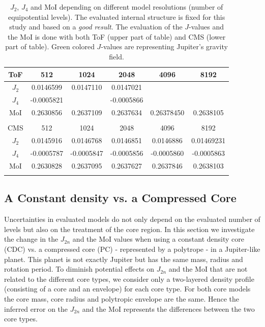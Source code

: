 \documentclass[usenatbib]{mnras}
\begin{document}
\begin{table}
\centering
\caption{$J_2$, $J_4$ and MoI depending on different model resolutions (number of equipotential levels). The evaluated internal structure is fixed for this study and based on a \textit{good result}. The evaluation of the $J$-values and the MoI is done with both ToF (upper part of table) and CMS (lower part of table). Green colored $J$-values are representing Jupiter's gravity field.}
 \begin{tabular}{c|c c c c c}
ToF & 512 & 1024 & 2048 & 4096 & 8192 \\
 \hline
$J_2$ & 0.0146599	&0.0147110	&0.0147021	&\color{green}{0.0146971} &\color{green}{0.0146965} \\
$J_4$ &-0.0005821	&\color{green}{-0.0005864}	&\color{green}-0.0005866	&\color{green}{-0.0005866}	&\color{green}{-0.000586682}\\
MoI	&0.2630856	&0.2637109	&0.2637634	&0.26378450	&0.2638105 \\
\\
CMS & 512 & 1024 & 2048 & 4096 & 8192 \\
 \hline
$J_2$ & 0.0145916	& 0.0146768	& 0.0146851	& 0.0146886 &  0.01469231\\
$J_4$ & -0.0005787	& -0.0005847 & -0.0005856 & -0.0005860 & -0.0005863\\
MoI & 0.2630828	& 0.2637095	& 0.2637627	& 0.2637846 &  0.2638103\\
\\
 \end{tabular}
\label{tab:resolution}
\end{table}

\subsection{A Constant density vs. a Compressed Core} \label{subsection:CDCvsPC}
Uncertainties in evaluated models do not only depend on the evaluated number of levels but also on the treatment of the core region. 
In this section we investigate the change in the $J_{2n}$ and the MoI values when using a constant density core (CDC) vs. a compressed core (PC) - represented by a polytrope - in a Jupiter-like planet. This planet is not exactly Jupiter but has the same mass, radius and rotation period. To diminish potential effects on $J_{2n}$ and the MoI that are not related to the different core types, we consider only a two-layered density profile (consisting of a core and an envelope) for each core type. For both core models the core mass, core radius and polytropic envelope are the same. Hence the inferred error on the $J_{2n}$ and the MoI represents the differences between the two core types.
\end{document}
